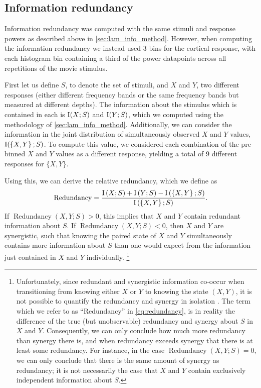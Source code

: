 \subsection{Information redundancy}
\label{sec:lam_redundancy_method}

Information redundancy was computed with the same stimuli and response powers as described above in \autoref{sec:lam_info_method}.
However, when computing the information redundancy we instead used \num{3} bins for the cortical response, with each histogram bin containing a third of the power datapoints across all repetitions of the movie stimulus.

First let us define $S$, to denote the set of stimuli, and $X$ and $Y$, two different responses (either different frequency bands or the same frequency bands but measured at different depths).
The information about the stimulus which is contained in each is $\operatorname{I}(X;S)$ and $\operatorname{I}(Y;S)$, which we computed using the methodology of \autoref{sec:lam_info_method}.
Additionally, we can consider the information in the joint distribution of simultaneously observed $X$ and $Y$ values, $\operatorname{I}(\left\{X,Y\right\};S)$.
To compute this value, we considered each combination of the pre-binned $X$ and $Y$ values as a different response, yielding a total of \num{9} different responses for $\{X,Y\}$.

Using this, we can derive the relative redundancy, which we define as
\begin{equation}
\label{eq:redundancy}
\operatorname{Redundancy}=\frac{
\operatorname{I}\left(X;S\right) + \operatorname{I}\left(Y;S\right) - \operatorname{I}\left(\left\{X,Y\right\};S\right)
}{
\operatorname{I}\left(\left\{X,Y\right\};S\right)
}
.\end{equation}
If $\operatorname{Redundancy}\left(X,Y;S\right) > 0$, this implies that $X$ and $Y$ contain redundant information about $S$.
If $\operatorname{Redundancy}\left(X,Y;S\right) < 0$, then $X$ and $Y$ are synergistic, such that knowing the paired state of $X$ and $Y$ simultaneously contains more information about $S$ than one would expect from the information just contained in $X$ and $Y$ individually.%
\footnote{
Unfortunately, since redundant and synergistic information co-occur when transitioning from knowing either $X$ or $Y$ to knowing the state $(X,Y)$, it is not possible to quantify the redundancy and synergy in isolation \citep{Latham2005,Averbeck2006,Williams2010,Griffith2014,Banerjee2015}.
The term which we refer to as ``Redundancy'' in \autoref{eq:redundancy}, is in reality the difference of the true (but unobservable) redundancy and synergy about $S$ in $X$ and $Y$.
Consequently, we can only conclude how much more redundancy than synergy there is, and when redundancy exceeds synergy that there is at least some redundancy.
For instance, in the case $\operatorname{Redundancy}\left(X,Y;S\right) = 0$, we can only conclude that there is the same amount of synergy as redundancy; it is not necessarily the case that $X$ and $Y$ contain exclusively independent information about $S$.
}

